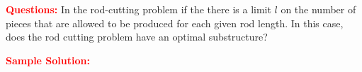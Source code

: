 \problem

\textcolor{Red}{\textbf{Questions:}}
In the rod-cutting problem if the there is a limit $l$ on the number of pieces that are allowed to be produced for each given rod length. In this case, does the rod cutting problem have an optimal substructure?

\textcolor{Red}{\textbf{Sample Solution:}}
 

